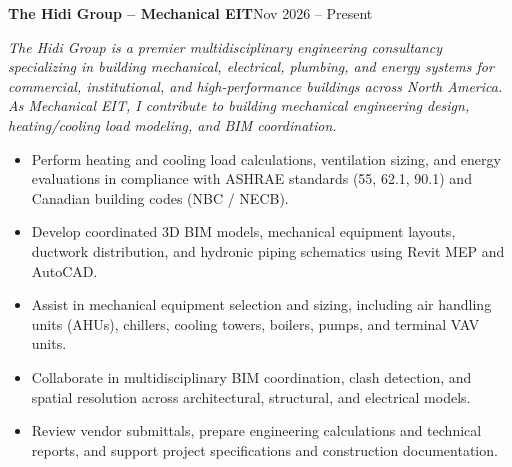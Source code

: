 \documentclass[10pt, letterpaper]{article}
\newcommand{\jobheader}[3]{\vspace{5pt}\textbf{#1 {--} #2}\hfill{\small\color{black}#3}\par\vspace{1pt}}
\newcommand{\jobcontext}[1]{{\small\textit{#1}}\vspace{3pt}\par}
\begin{document}
\jobheader{The Hidi Group}{Mechanical EIT}{Nov 2026 -- Present}
\jobcontext{The Hidi Group is a premier multidisciplinary engineering consultancy specializing in building mechanical, electrical, plumbing, and energy systems for commercial, institutional, and high-performance buildings across North America. As Mechanical EIT, I contribute to building mechanical engineering design, heating/cooling load modeling, and BIM coordination.}
\begin{itemize}
  \item Perform heating and cooling load calculations, ventilation sizing, and energy evaluations in compliance with ASHRAE standards (55, 62.1, 90.1) and Canadian building codes (NBC / NECB).
  \item Develop coordinated 3D BIM models, mechanical equipment layouts, ductwork distribution, and hydronic piping schematics using Revit MEP and AutoCAD.
  \item Assist in mechanical equipment selection and sizing, including air handling units (AHUs), chillers, cooling towers, boilers, pumps, and terminal VAV units.
  \item Collaborate in multidisciplinary BIM coordination, clash detection, and spatial resolution across architectural, structural, and electrical models.
  \item Review vendor submittals, prepare engineering calculations and technical reports, and support project specifications and construction documentation.
\end{itemize}

\vspace{3pt}
\end{document}
